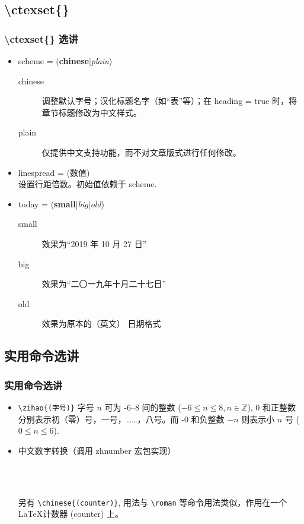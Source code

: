 \documentclass[final,aspectratio=32]{ctexbeamer}
\begin{document}
\subsection{\textbackslash ctexset\{\}}
\begin{frame}
\frametitle{\textbackslash ctexset\{\} 选讲}
\begin{itemize}
  \item scheme = (\textbf{chinese}|\emph{plain})
  \begin{description}
    \item[chinese] 调整默认字号；汉化标题名字（如“表”等）；在 heading = true 时，将章节标题修改为中文样式。
    \item[plain] 仅提供中文支持功能，而不对文章版式进行任何修改。
  \end{description}
\item linespread = (数值)\\
设置行距倍数。初始值依赖于 scheme.
\item today = (\textbf{small}|\emph{big}|\emph{old})
\begin{description}
  \item[small] 效果为“2019 年 10 月 27 日”
  \item[big] 效果为“二〇一九年十月二十七日”
  \item[old] 效果为原本的（英文） 日期格式 
\end{description}
\end{itemize}
\end{frame}

\subsection{实用命令选讲}
\begin{frame}[fragile]
\frametitle{实用命令选讲}
\begin{itemize}
\item \verb|\zihao{(字号)}| 字号 $n$ 可为 -6--8 间的整数 ($-6 \leq n \leq 8, n \in \mathbb{Z}$), 0 和正整数分别表示初（零）号，一号，……，八号。而 -0 和负整数 $-n$ 则表示小 $n$ 号 ($0 \leq n \leq 6$).
\item 中文数字转换（调用 zhnumber 宏包实现） %
\begin{sidelst}
 \\
 \\
\end{sidelst}
另有 \verb|\chinese{(counter)}|, 用法与 \verb|\roman| 等命令用法类似，作用在一个 \LaTeX 计数器 (counter) 上。
\end{itemize}
\end{frame}
\end{document}
